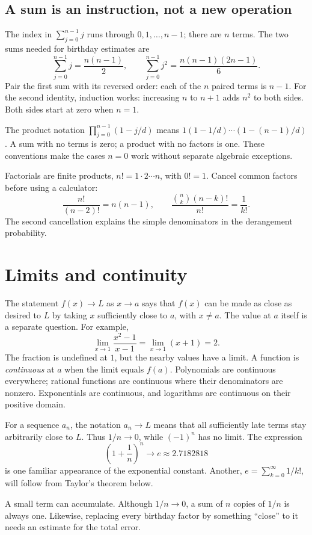 \subsection*{A sum is an instruction, not a new operation}
The index in $\sum_{j=0}^{n-1}j$ runs through $0,1,\ldots,n-1$;
there are $n$ terms. The two sums needed for birthday estimates are
\[
 \sum_{j=0}^{n-1}j=\frac{n(n-1)}2,\qquad
 \sum_{j=0}^{n-1}j^2=\frac{n(n-1)(2n-1)}6.
\]
Pair the first sum with its reversed order: each of the $n$ paired
terms is $n-1$. For the second identity, induction works: increasing
$n$ to $n+1$ adds $n^2$ to both sides. Both sides start at zero
when $n=1$.

The product notation $\prod_{j=0}^{n-1}(1-j/d)$ means
$1(1-1/d)\cdots(1-(n-1)/d)$. A sum with no terms is zero; a product
with no factors is one. These conventions make the cases $n=0$ work
without separate algebraic exceptions.

Factorials are finite products, $n!=1\cdot2\cdots n$, with $0!=1$.
Cancel common factors before using a calculator:
\[
 \frac{n!}{(n-2)!}=n(n-1),\qquad
 \frac{\binom nk(n-k)!}{n!}=\frac1{k!}.
\]
The second cancellation explains the simple denominators in the
derangement probability.

\section{Limits and continuity}

The statement $f(x)\to L$ as $x\to a$ says that $f(x)$ can be made
as close as desired to $L$ by taking $x$ sufficiently close to $a$,
with $x\ne a$. The value at $a$ itself is a separate question.
For example,
\[
 \lim_{x\to1}\frac{x^2-1}{x-1}
 =\lim_{x\to1}(x+1)=2.
\]
The fraction is undefined at $1$, but the nearby values have a limit.
A function is \emph{continuous} at $a$ when the limit equals $f(a)$.
Polynomials are continuous everywhere; rational functions are continuous
where their denominators are nonzero. Exponentials are continuous, and
logarithms are continuous on their positive domain.

For a sequence $a_n$, the notation $a_n\to L$ means that all sufficiently
late terms stay arbitrarily close to $L$. Thus $1/n\to0$, while
$(-1)^n$ has no limit. The expression
\[
 \left(1+\frac1n\right)^n\longrightarrow e\approx2.7182818
\]
is one familiar appearance of the exponential constant. Another,
$e=\sum_{k=0}^{\infty}1/k!$, will follow from Taylor's theorem below.

\begin{warningbox}
A small term can accumulate. Although $1/n\to0$, a sum of $n$ copies
of $1/n$ is always one. Likewise, replacing every birthday factor by
something ``close'' to it needs an estimate for the total error.
\end{warningbox}

